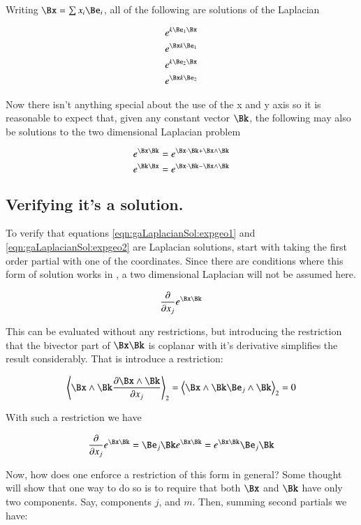 Writing $\Bx = \sum x_i \Be_i$, all of the following are solutions
of the Laplacian

\begin{align*}
e^{k\Be_1\Bx} \\
e^{\Bx k\Be_1} \\
e^{k\Be_2\Bx} \\
e^{\Bx k\Be_2} \\
\end{align*}

Now there isn't anything special about the use of the x and y axis so it is reasonable to expect that, given any constant vector $\Bk$,
the following may also be solutions to the two dimensional Laplacian problem

\begin{equation}\label{eqn:gaLaplacianSol:expgeo1}
e^{\Bx\Bk} = e^{\Bx \cdot \Bk + \Bx \wedge \Bk}
\end{equation}
\begin{equation}\label{eqn:gaLaplacianSol:expgeo2}
e^{\Bk\Bx} = e^{\Bx \cdot \Bk - \Bx \wedge \Bk}
\end{equation}

\subsection{Verifying it's a solution. }

To verify that equations \ref{eqn:gaLaplacianSol:expgeo1} and \ref{eqn:gaLaplacianSol:expgeo2} are Laplacian solutions, start with taking the first order partial with one of the coordinates.
Since there are conditions where this form of solution works in ,
a two dimensional Laplacian will not be assumed here.

\[
\dxj{}{j}e^{\Bx\Bk}
\]

This can be evaluated without any restrictions, but introducing the restriction that the bivector part of $\Bx\Bk$
is coplanar with it's derivative simplifies the result considerably.  That is introduce a restriction:

\[
\gpgradetwo{ \Bx \wedge \Bk \dxj{\Bx \wedge \Bk}{j} } = \gpgradetwo{ \Bx \wedge \Bk \Be_j \wedge \Bk } = 0
\]

With such a restriction we have

\[
\dxj{}{j}e^{\Bx\Bk} = \Be_j\Bk e^{\Bx\Bk} = e^{\Bx\Bk} \Be_j\Bk 
\]

Now, how does one enforce a restriction of this form in general?  Some thought will show that one way to do so 
is to require that
both $\Bx$ and $\Bk$ have only two components.  Say, components $j$, and $m$.  Then, summing second partials
we have:

